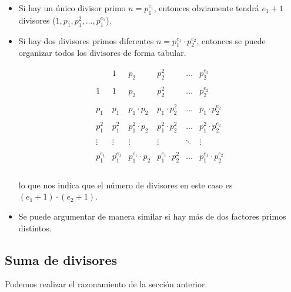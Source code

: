 \begin{itemize}
	\item Si hay un único divisor primo $n = p_1^{e_1}$, entonces obviamente tendrá $e_1 + 1$ divisores ($1, p_1, p_1^2, \dots, p_1^{e_1}$).
	\item Si hay dos divisores primos diferentes  $n = p_1^{e_1} \cdot p_2^{e_2}$, entonces se puede organizar todos los divisores de forma tabular.
	
	$$\begin{array}{c|ccccc} & 1 & p_2 & p_2^2 & \dots & p_2^{e_2} \\\\\hline 1 & 1 & p_2 & p_2^2 & \dots & p_2^{e_2} \\\\ p_1 & p_1 & p_1 \cdot p_2 & p_1 \cdot p_2^2 & \dots & p_1 \cdot p_2^{e_2} \\\\ p_1^2 & p_1^2 & p_1^2 \cdot p_2 & p_1^2 \cdot p_2^2 & \dots & p_1^2 \cdot p_2^{e_2} \\\\ \vdots & \vdots & \vdots & \vdots & \ddots & \vdots \\\\ p_1^{e_1} & p_1^{e_1} & p_1^{e_1} \cdot p_2 & p_1^{e_1} \cdot p_2^2 & \dots & p_1^{e_1} \cdot p_2^{e_2} \\\\ \end{array}$$
	
	lo que nos indica que el número de divisores en este caso es $(e_1 + 1) \cdot (e_2 + 1)$.
	
	\item Se puede argumentar de manera similar si hay más de dos factores primos distintos.
\end{itemize}

\subsection{Suma de divisores}

Podemos realizar el razonamiento de la sección anterior.

